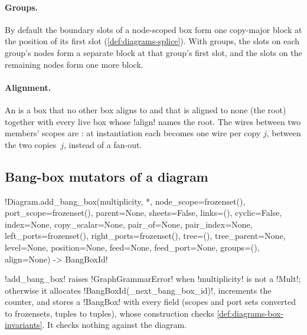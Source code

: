 \paragraph{Groups.} By default the boundary slots of a node-scoped box form one copy-major block at the position of its first slot (\cref{def:diagrams-splice}). With groups, the slots on each group's nodes form a separate block at that group's first slot, and the slots on the remaining nodes form one more block.

\paragraph{Alignment.} An  is a box that no other box aligns to and that is aligned to none (the root) together with every live box whose \py!align! names the root. The wires between two members' scopes are : at instantiation each becomes one wire per copy $j$, between the two copies~$j$, instead of a fan-out.

\subsection{Bang-box mutators of a diagram}\label{sec:diagrams-box-mutators}

\begin{signature}
\py!Diagram.add_bang_box(multiplicity, *, node_scope=frozenset(), port_scope=frozenset(), parent=None, sheets=False, links=(), cyclic=False, index=None, copy_scalar=None, pair_of=None, pair_index=None, left_ports=frozenset(), right_ports=frozenset(), tree=(), tree_parent=None, level=None, position=None, feed=None, feed_port=None, groups=(), align=None) -> BangBoxId!
\end{signature}

\py!add_bang_box! raises \py!GraphGrammarError! when \py!multiplicity! is not a \py!Mult!; otherwise it allocates \py!BangBoxId(_next_bang_box_id)!, increments the counter, and stores a \py!BangBox! with every field (scopes and port sets converted to frozensets, tuples to tuples), whose construction checks \cref{def:diagrams-box-invariants}. It checks nothing against the diagram.

